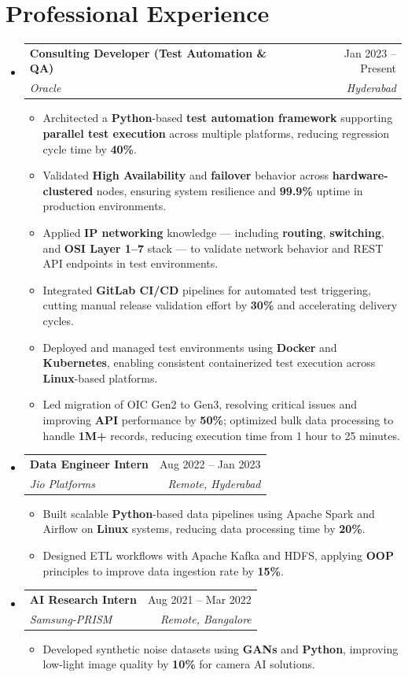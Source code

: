 \documentclass[letterpaper,11pt]{article}
\makeatletter
\newcommand{\resumeItem}[1]{
  \item\small{
    {#1 \vspace{-2pt}}
  }
}
\newcommand{\resumeSubheading}[4]{
  \vspace{-2pt}\item
    \begin{tabular*}{0.97\textwidth}[t]{l@{\extracolsep{\fill}}r}
      \textbf{#1} & #2 \\
      \textit{\small#3} & \textit{\small #4} \\
    \end{tabular*}\vspace{-7pt}
}
\newcommand{\resumeSubHeadingListStart}{\begin{itemize}[leftmargin=0.15in, label={}]}
\newcommand{\resumeSubHeadingListEnd}{\end{itemize}}
\newcommand{\resumeItemListStart}{\begin{itemize}}
\newcommand{\resumeItemListEnd}{\end{itemize}\vspace{-5pt}}
\makeatother
\begin{document}
\section{Professional Experience}
\resumeSubHeadingListStart
    \resumeSubheading
      {Consulting Developer (Test Automation \& QA)}{Jan 2023 -- Present}
      {Oracle}{Hyderabad}
      \resumeItemListStart
        \resumeItem{Architected a \textbf{Python}-based \textbf{test automation framework} supporting \textbf{parallel test execution} across multiple platforms, reducing regression cycle time by \textbf{40\%}.}
        \resumeItem{Validated \textbf{High Availability} and \textbf{failover} behavior across \textbf{hardware-clustered} nodes, ensuring system resilience and \textbf{99.9\%} uptime in production environments.}
        \resumeItem{Applied \textbf{IP networking} knowledge — including \textbf{routing}, \textbf{switching}, and \textbf{OSI Layer 1--7} stack — to validate network behavior and REST API endpoints in test environments.}
        \resumeItem{Integrated \textbf{GitLab CI/CD} pipelines for automated test triggering, cutting manual release validation effort by \textbf{30\%} and accelerating delivery cycles.}
        \resumeItem{Deployed and managed test environments using \textbf{Docker} and \textbf{Kubernetes}, enabling consistent containerized test execution across \textbf{Linux}-based platforms.}
        \resumeItem{Led migration of OIC Gen2 to Gen3, resolving critical issues and improving \textbf{API} performance by \textbf{50\%}; optimized bulk data processing to handle \textbf{1M+} records, reducing execution time from 1 hour to 25 minutes.}
      \resumeItemListEnd
    \resumeSubheading
      {Data Engineer Intern}{Aug 2022 -- Jan 2023}
      {Jio Platforms}{Remote, Hyderabad}
      \resumeItemListStart
        \resumeItem{Built scalable \textbf{Python}-based data pipelines using Apache Spark and Airflow on \textbf{Linux} systems, reducing data processing time by \textbf{20\%}.}
        \resumeItem{Designed ETL workflows with Apache Kafka and HDFS, applying \textbf{OOP} principles to improve data ingestion rate by \textbf{15\%}.}
      \resumeItemListEnd
    \resumeSubheading
      {AI Research Intern}{Aug 2021 -- Mar 2022}
      {Samsung-PRISM}{Remote, Bangalore}
      \resumeItemListStart
        \resumeItem{Developed synthetic noise datasets using \textbf{GANs} and \textbf{Python}, improving low-light image quality by \textbf{10\%} for camera AI solutions.}
      \resumeItemListEnd
\resumeSubHeadingListEnd
\end{document}
